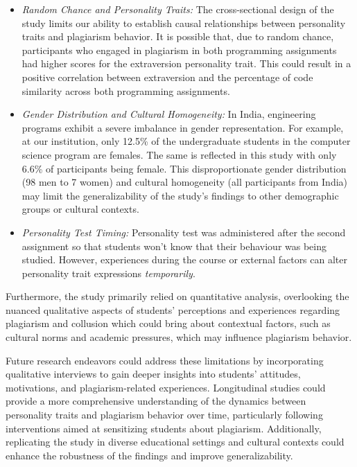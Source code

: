 \begin{itemize}
    \item \textit{Random Chance and Personality Traits:} The cross-sectional design of the study limits our ability to establish causal relationships between personality traits and plagiarism behavior. It is possible that, due to random chance, participants who engaged in plagiarism in both programming assignments had higher scores for the extraversion personality trait. This could result in a positive correlation between extraversion and the percentage of code similarity across both programming assignments.
    \item \textit{Gender Distribution and Cultural Homogeneity:} In India, engineering programs exhibit a severe imbalance in gender representation. For example, at our institution, only 12.5\% of the undergraduate students in the computer science program are females. The same is reflected in this study with only 6.6\% of participants being female. This disproportionate gender distribution (98 men to 7 women) and cultural homogeneity (all participants from India) may limit the generalizability of the study's findings to other demographic groups or cultural contexts.  
    \item \textit{Personality Test Timing:} Personality test was administered after the second assignment so that students won't know that their behaviour was being studied. However,  experiences during the course or external factors can alter personality trait expressions \emph{temporarily}.
\end{itemize}

Furthermore, the study primarily relied on quantitative analysis, overlooking the nuanced qualitative aspects of students' perceptions and experiences regarding plagiarism and collusion which could bring about contextual factors, such as cultural norms and academic pressures, which may influence plagiarism behavior.

Future research endeavors could address these limitations by incorporating qualitative interviews to gain deeper insights into students' attitudes, motivations, and plagiarism-related experiences. Longitudinal studies could provide a more comprehensive understanding of the dynamics between personality traits and plagiarism behavior over time, particularly following interventions aimed at sensitizing students about plagiarism. Additionally, replicating the study in diverse educational settings and cultural contexts could enhance the robustness of the findings and improve generalizability.


